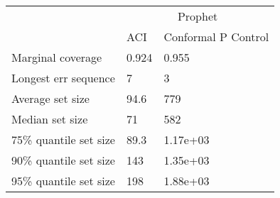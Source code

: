 \begin{tabular}{lll}
\toprule
& \multicolumn{2}{c}{Prophet} \\
& ACI & Conformal P Control \\
\midrule
Marginal coverage & 0.924 & 0.955 \\
Longest err sequence & 7 & 3 \\
Average set size & 94.6 & 779 \\
Median set size & 71 & 582 \\
75\% quantile set size & 89.3 & 1.17e+03 \\
90\% quantile set size & 143 & 1.35e+03 \\
95\% quantile set size & 198 & 1.88e+03 \\
\bottomrule
\end{tabular}
